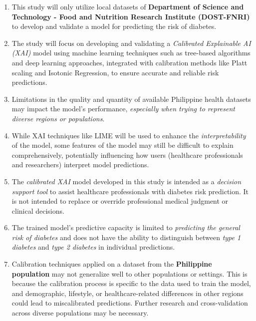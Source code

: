 \begin{enumerate}
    \item This study will only utilize local datasets of \textbf{Department of Science and Technology - Food and Nutrition Research Institute (DOST-FNRI)} to develop and validate a model for predicting the risk of diabetes.
    
    \item The study will focus on developing and validating a \textit{Calibrated Explainable AI (XAI)} model using machine learning techniques such as tree-based algorithms and deep learning approaches, integrated with calibration methods like Platt scaling and Isotonic Regression, to ensure accurate and reliable risk predictions.
    
    \item Limitations in the quality and quantity of available Philippine health datasets may impact the model's performance, \textit{especially when trying to represent diverse regions or populations}.
    
    \item While XAI techniques like LIME will be used to enhance the \textit{interpretability} of the model, some features of the model may still be difficult to explain comprehensively, potentially influencing how users (healthcare professionals and researchers) interpret model predictions.
    
    \item The \textit{calibrated XAI} model developed in this study is intended as a \textit{decision support tool} to assist healthcare professionals with diabetes risk prediction. It is not intended to replace or override professional medical judgment or clinical decisions.
    
    \item The trained model's predictive capacity is limited to \textit{predicting the general risk of diabetes} and does not have the ability to distinguish between \textit{type 1 diabetes} and \textit{type 2 diabetes} in individual predictions.
    
    \item Calibration techniques applied on a dataset from the \textbf{Philippine population} may not generalize well to other populations or settings. This is because the calibration process is specific to the data used to train the model, and demographic, lifestyle, or healthcare-related differences in other regions could lead to miscalibrated predictions. Further research and cross-validation across diverse populations may be necessary.
\end{enumerate}

